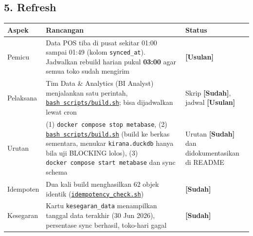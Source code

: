 \documentclass[10pt,a4paper]{article}
\begin{document}
\subsection{5. Refresh}\label{refresh}

{\def\LTcaptype{none} %
\begin{longtable}[]{@{}
  >{\raggedright\arraybackslash}p{}
  >{\raggedright\arraybackslash}p{}
  >{\raggedright\arraybackslash}p{}@{}}
\toprule\noalign{}
\begin{minipage}[b]{\linewidth}\raggedright
Aspek
\end{minipage} & \begin{minipage}[b]{\linewidth}\raggedright
Rancangan
\end{minipage} & \begin{minipage}[b]{\linewidth}\raggedright
Status
\end{minipage} \\
\midrule\noalign{}
\endhead
\bottomrule\noalign{}
\endlastfoot
Pemicu & Data POS tiba di pusat sekitar 01:00 sampai 01:49 (kolom \texttt{synced\_\allowbreak{}at}). Jadwalkan rebuild harian pukul \textbf{03:00} agar semua toko sudah mengirim & \textbf{{[}Usulan{]}} \\
Pelaksana & Tim Data \& Analytics (BI Analyst) menjalankan satu perintah, \href{https://github.com/titan2903/kirana-omnichannel-performance-intelligence/blob/master/scripts/build.sh}{\texttt{bash\ scripts/build.sh}}; bisa dijadwalkan lewat cron & Skrip \textbf{{[}Sudah{]}}, jadwal \textbf{{[}Usulan{]}} \\
Urutan & (1) \texttt{docker\ compose\ stop\ metabase}, (2) \href{https://github.com/titan2903/kirana-omnichannel-performance-intelligence/blob/master/scripts/build.sh}{\texttt{bash\ scripts/build.sh}} (build ke berkas sementara, menukar \texttt{kirana.duckdb} hanya bila uji BLOCKING lolos), (3) \texttt{docker\ compose\ start\ metabase} dan sync schema & Urutan \textbf{{[}Sudah{]}} dan didokumentasikan di README \\
Idempoten & Dua kali build menghasilkan 62 objek identik (\href{https://github.com/titan2903/kirana-omnichannel-performance-intelligence/blob/master/scripts/idempotency_check.sh}{\texttt{idempotency\_\allowbreak{}check.sh}}) & \textbf{{[}Sudah{]}} \\
Kesegaran & Kartu \texttt{kesegaran\_\allowbreak{}data} menampilkan tanggal data terakhir (30 Jun 2026), persentase sync berhasil, toko-hari gagal & \textbf{{[}Sudah{]}} \\
\end{longtable}
}
\end{document}

